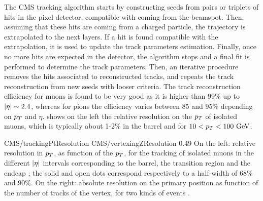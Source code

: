     The CMS tracking algorithm \cite{CMStracking} starts by constructing seeds from pairs or triplets of hits
    in the pixel detector, compatible with coming from the beamspot. Then, assuming that these
    hits are coming from a charged particle, the trajectory is extrapolated to the
    next layers. If a hit is found compatible with the extrapolation, it is used to
    update the track parameters estimation. Finally, once no more hits are expected in the
    detector, the algorithm stops and a final fit is performed to determine the track
    parameters. Then, an iterative procedure removes the hits associated to reconstructed
    tracks, and repeats the track reconstruction from new seeds with looser criteria.
    The track reconstruction efficiency for muons is found to be very good as it is
    higher than 99\% up to $\left| \eta \right| \sim 2.4$, whereas for pions the efficiency varies
    between 85 and 95\% depending on $p_T$ and $\eta$. 
    shows on the left the relative resolution on the $p_T$ of isolated muons, which
    is typically about 1-2\% in the barrel and for $10 < p_T < 100~\text{GeV}$.

                     {CMS/trackingPtResolution}
                     {CMS/vertexingZResolution}
                     {0.49}
                     {On the left: relative resolution in $p_T$, as function of the $p_T$, for the
                     tracking of isolated muons in the different $\left| \eta \right|$ intervals corresponding
                     to the barrel,
                     the transition region and the endcap ; the solid and open dots correspond respectively
                     to a half-width of 68\% and 90\%. On the right: absolute resolution on the
                     primary position as function of the number of tracks of the vertex,
                     for two kinds of events \cite{CMStracking}.}

